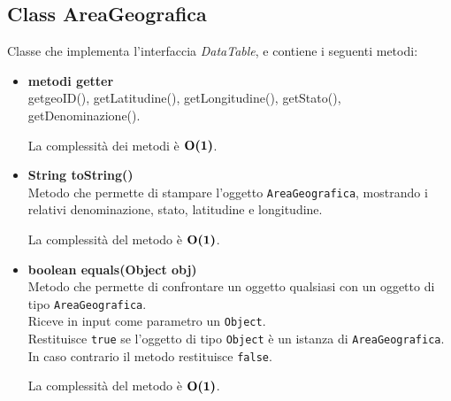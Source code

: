 \documentclass[a4paper, 12pt]{scrreprt}
\begin{document}
			\subsection{Class AreaGeografica}
			Classe che implementa l'interfaccia \textsl{DataTable}, e contiene i seguenti metodi:
				\begin{itemize}
				\item \textbf{metodi getter}
				\\getgeoID(), getLatitudine(), getLongitudine(), getStato(), getDenominazione().
				
				La complessit\`a dei metodi \`e $\mathbf{O}\textbf{(1)}$.
				
				\item \textbf{String toString()}
				\\Metodo che permette di stampare l'oggetto \verb!AreaGeografica!, mostrando i relativi denominazione, stato, latitudine e longitudine.
				
				La complessit\`a del metodo \`e $\mathbf{O}\textbf{(1)}$.
				
				\item \textbf{boolean equals(Object obj)}
				\\Metodo che permette di confrontare un oggetto qualsiasi con un oggetto di tipo \verb!AreaGeografica!.
				\\Riceve in input come parametro un \verb!Object!.
				\\Restituisce \verb!true! se l'oggetto di tipo \verb!Object! \`e un istanza di \verb!AreaGeografica!.
				\\In caso contrario il metodo restituisce \verb!false!.
				
				La complessit\`a del metodo \`e $\mathbf{O}\textbf{(1)}$.
				
			\end{itemize}
\pagebreak
\end{document}
